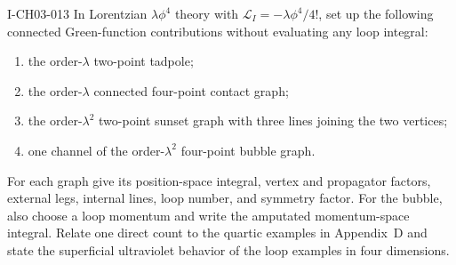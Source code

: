 \begin{exercise}{I-CH03-013}
In Lorentzian $\lambda\phi^4$ theory with
\(\mathcal L_I=-\lambda\phi^4/4!\), set up the following connected Green-function
contributions without evaluating any loop integral:
\begin{enumerate}[label=(\alph*)]
 \item the order-$\lambda$ two-point tadpole;
 \item the order-$\lambda$ connected four-point contact graph;
 \item the order-$\lambda^2$ two-point sunset graph with three lines joining
 the two vertices;
 \item one channel of the order-$\lambda^2$ four-point bubble graph.
\end{enumerate}
For each graph give its position-space integral, vertex and propagator factors,
external legs, internal lines, loop number, and symmetry factor.  For the
bubble, also choose a loop momentum and write the amputated momentum-space
integral.  Relate one direct count to the quartic examples in Appendix~D and
state the superficial ultraviolet behavior of the loop examples in four
dimensions.
\end{exercise}
